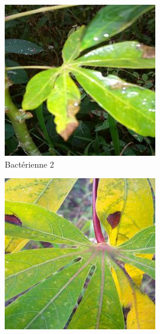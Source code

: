 \begin{itemize}
\begin{figure}[htbp]
\begin{subfigure}[b]{0.3\textwidth}
			\includegraphics[width=\textwidth]{images/2.jpg}
			\caption{Bactérienne 2}
		\end{subfigure}
		\hfill
		\begin{subfigure}[b]{0.3\textwidth}
			\centering
			\includegraphics[width=\textwidth]{images/3.jpg}

\end{subfigure}
\end{figure}
\end{itemize}
